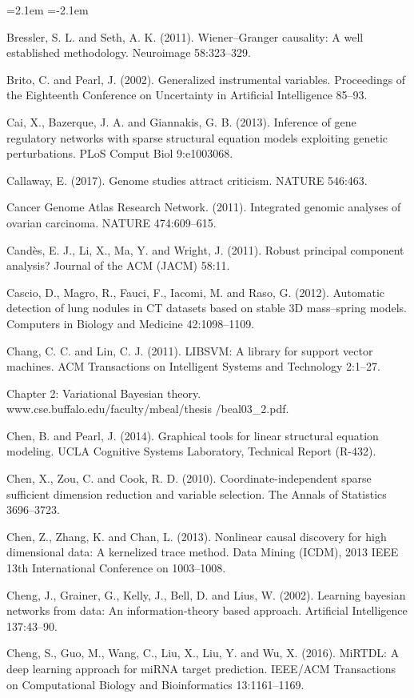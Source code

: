 \begin{list}{}{\leftmargin=2.1em  
  \itemindent=-2.1em \parsep=0pt \itemsep=2pt \topsep=0pt}
\item Bressler, S. L. and Seth, A. K. (2011). Wiener--Granger causality: A well established methodology. Neuroimage 58:323--329.
\item Brito, C. and Pearl, J. (2002). Generalized instrumental variables. Proceedings of the Eighteenth Conference on Uncertainty in Artificial Intelligence 85--93.
\item Cai, X., Bazerque, J. A. and Giannakis, G. B. (2013). Inference of gene regulatory networks with sparse structural equation models exploiting genetic perturbations. PLoS Comput Biol 9:e1003068.
\item Callaway, E. (2017). Genome studies attract criticism. NATURE 546:463.
\item Cancer Genome Atlas Research Network. (2011). Integrated genomic analyses of ovarian carcinoma. NATURE 474:609--615.
\item Candès, E. J., Li, X., Ma, Y. and Wright, J. (2011). Robust principal component analysis? Journal of the ACM (JACM) 58:11.
\item Cascio, D., Magro, R., Fauci, F., Iacomi, M. and Raso, G. (2012). Automatic detection of lung nodules in CT datasets based on stable 3D mass--spring models. Computers in Biology and Medicine 42:1098--1109.
\item Chang, C. C. and Lin, C. J. (2011). LIBSVM: A library for support vector machines. ACM Transactions on Intelligent Systems and Technology 2:1--27.
\item Chapter 2: Variational Bayesian theory. www.cse.buffalo.edu/faculty/mbeal/thesis /beal03\_2.pdf.
\item Chen, B. and Pearl, J. (2014). Graphical tools for linear structural equation modeling. UCLA Cognitive Systems Laboratory, Technical Report (R-432).
\item Chen, X., Zou, C. and Cook, R. D. (2010). Coordinate-independent sparse sufficient dimension reduction and variable selection. The Annals of Statistics 3696--3723.
\item Chen, Z., Zhang, K. and Chan, L. (2013). Nonlinear causal discovery for high dimensional data: A kernelized trace method. Data Mining (ICDM), 2013 IEEE 13th International Conference on 1003--1008.
\item Cheng, J., Grainer, G., Kelly, J., Bell, D. and Lius, W. (2002). Learning bayesian networks from data: An information-theory based approach. Artificial Intelligence 137:43--90.
\item Cheng, S., Guo, M., Wang, C., Liu, X., Liu, Y. and Wu, X. (2016). MiRTDL: A deep learning approach for miRNA target prediction. IEEE/ACM Transactions on Computational Biology and Bioinformatics 13:1161--1169.

\end{list}
